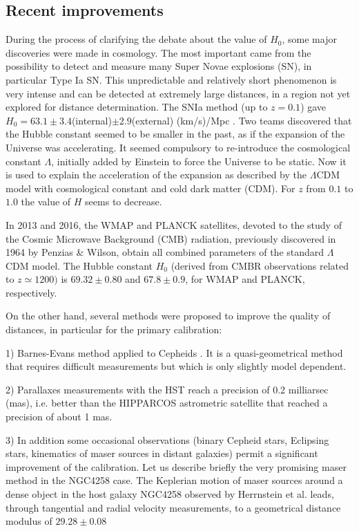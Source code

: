 \subsection{Recent improvements}
\label{sec2.3}

During the process of clarifying the debate about the value of $H_0$, some major discoveries were made in cosmology. The most important came from the possibility to detect and measure many Super Novae  explosions (SN), in particular Type Ia SN.  This unpredictable and relatively short phenomenon is very intense and can be detected at extremely large distances, in a region not yet explored for distance determination.  The SNIa method  (up to $z=0.1$) gave $H_0=63.1\pm3.4$(internal)$\pm2.9$(external) (km/s)/Mpc \cite{hamuy}.   Two teams \cite{perl,riess} discovered that the Hubble constant seemed to be smaller in the past, as if the expansion of the Universe was accelerating. It seemed compulsory to re-introduce the cosmological constant $\Lambda$, initially added by Einstein to force the Universe to be static. Now it is used to explain the acceleration of the expansion as described by the $\Lambda$CDM model with cosmological constant and cold dark matter (CDM).  For $z$ from $0.1$ to $1.0$ the value of $H$ seems to decrease.

In 2013 and 2016, the WMAP \cite{wmap} and PLANCK \cite{planck} satellites, devoted to the study of the Cosmic Microwave Background  (CMB) radiation, previously discovered  in 1964 by Penzias \& Wilson, obtain all combined parameters of the standard $\Lambda$CDM model. The Hubble constant $H_0$  (derived from CMBR observations related to $ z \simeq 1200)$  is $69.32\pm0.80$ and $67.8\pm 0.9$, for WMAP and PLANCK, respectively.

On the other hand, several methods were proposed to improve the quality of distances, in particular for the primary calibration:

1)  Barnes-Evans method  applied  to Cepheids \cite{gieren}. It is a quasi-geometrical method that requires difficult measurements but which is only  slightly model dependent. 

2) Parallaxes measurements with the HST \cite{benedict} reach a precision of 0.2 milliarsec (mas), i.e. better than the HIPPARCOS astrometric satellite that  reached a precision of about 1 mas.  

3) In addition some occasional observations (binary Cepheid stars, Eclipsing stars, kinematics of  maser sources in distant galaxies) permit a significant improvement  of the calibration. Let us describe briefly the very promising maser method in the NGC4258 case. The Keplerian motion of maser sources around a dense object in the host galaxy NGC4258 observed by Herrnstein et al. \cite{4258}  leads, through tangential and radial velocity measurements, to a geometrical distance modulus of $29.28\pm0.08$   

